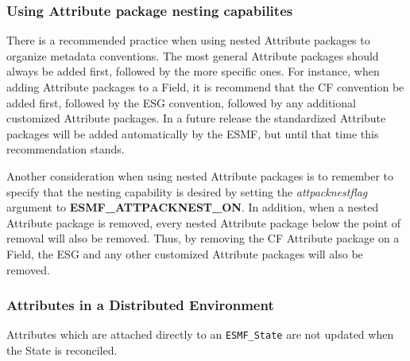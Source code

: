\subsubsection{Using Attribute package nesting capabilites}

There is a recommended practice when using nested Attribute packages to organize metadata conventions.  The most general Attribute packages should always be added first, followed by the more specific ones.  For instance, when adding Attribute packages to a Field, it is recommend that the CF convention be added first, followed by the ESG convention, followed by any additional customized Attribute packages.  In a future release the standardized Attribute packages will be added automatically by the ESMF, but until that time this recommendation stands.

Another consideration when using nested Attribute packages is to remember to specify that the nesting capability is desired by setting the {\it attpacknestflag} argument to {\bf ESMF\_ATTPACKNEST\_ON}.  In addition, when a nested Attribute package is removed, every nested Attribute package below the point of removal will also be removed.  Thus, by removing the CF Attribute package on a Field, the ESG and any other customized Attribute packages will also be removed.

\subsubsection{Attributes in a Distributed Environment} 

Attributes which are attached directly to an {\tt ESMF\_State} are not updated when the State is reconciled.  





